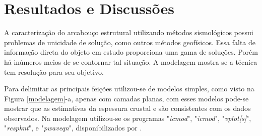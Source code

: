 \chapter{Resultados e Discussões}	

A caracterização do arcabouço estrutural utilizando métodos sismológicos possui problemas de unicidade de solução, como outros métodos geofísicos.  Essa falta de informação direta do objeto em estudo proporciona uma gama de soluções. Porém há inúmeros meios de se contornar tal situação. A modelagem mostra se a técnica tem resolução para seu objetivo.

Para delimitar as principais feições utilizou-se de modelos simples, como visto na Figura \ref{modelagem}-a, apenas com camadas planas, com esses modelos pode-se mostrar que as estimativas da espessura crustal e são consistentes com os dados observados. Na modelagem utilizou-se os programas "\textit{icmod}", "\textit{icmod}", "\textit{vplot[s]}", "\textit{respknt}",  e "\textit{pwaveqn}", disponibilizados por \cite{Ammon_waterlevel_1997}.


